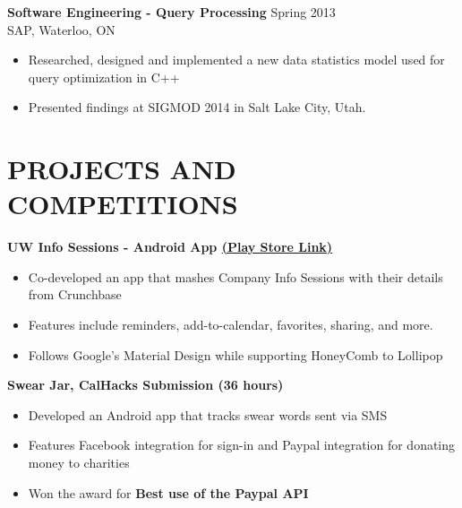 \documentclass[margin]{res}
\begin{document}
\begin{resume}
{\bf Software Engineering - Query Processing}  \hfill  Spring 2013 \\ SAP, Waterloo, ON
\begin{itemize} \itemsep -2pt %
\item Researched, designed and implemented a new data statistics model used for query optimization in C++
\item Presented findings at SIGMOD 2014 in Salt Lake City, Utah.
\end{itemize}





\section{PROJECTS \newline AND COMPETITIONS}
{\bf UW Info Sessions - Android App \href{https://play.google.com/store/apps/details?id=com.sixbynine.infosessions}{\bf (Play Store Link)}}
\begin{itemize} \itemsep -2pt
\item Co-developed an app that mashes Company Info Sessions with their details from Crunchbase
\item Features include reminders, add-to-calendar, favorites, sharing, and more.
\item Follows Google's Material Design while supporting HoneyComb to Lollipop
\end{itemize}

{\bf Swear Jar, CalHacks Submission (36 hours)}
\begin{itemize} \itemsep -2pt
\item Developed an Android app that tracks swear words sent via SMS
\item Features Facebook integration for sign-in and Paypal integration for donating money to charities
\item Won the award for {\bf Best use of the Paypal API} 	
\end{itemize}


\end{resume}
\end{document}
